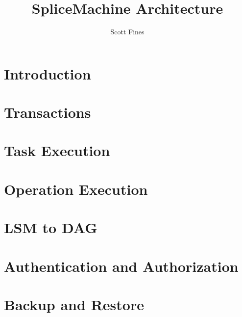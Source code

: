 \documentclass[10pt]{amsbook}
\begin{document}
\title{SpliceMachine Architecture}
\author{Scott Fines}

\maketitle
\begingroup
\let\clearpage\relax
\chapter*{Introduction}

\endgroup

\tableofcontents
\begingroup
\let\clearpage\relax
\chapter{Transactions}

\chapter{Task Execution}

\chapter{Operation Execution}

\chapter{LSM to DAG}

\chapter{Authentication and Authorization}


\chapter{Backup and Restore}


\endgroup
\end{document}
